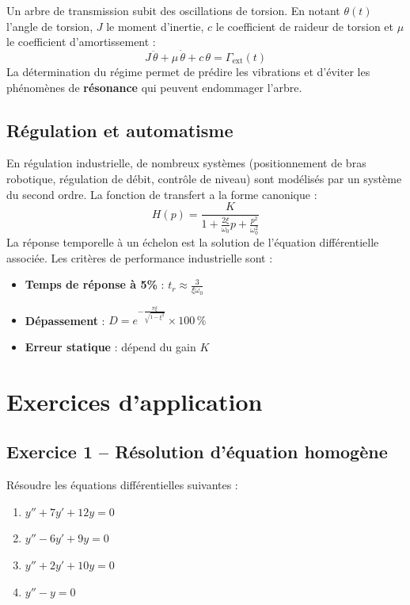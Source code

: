 \documentclass[a4paper,11pt]{article}
\begin{document}
\begin{appliindus}
Un arbre de transmission subit des oscillations de torsion. En notant $\theta(t)$ l'angle de torsion, $J$ le moment d'inertie, $c$ le coefficient de raideur de torsion et $\mu$ le coefficient d'amortissement :
\[
J\,\ddot{\theta} + \mu\,\dot{\theta} + c\,\theta = \Gamma_{\text{ext}}(t)
\]
La détermination du régime permet de prédire les vibrations et d'éviter les phénomènes de \textbf{résonance} qui peuvent endommager l'arbre.
\end{appliindus}

\subsection{Régulation et automatisme}

\begin{appliindus}
En régulation industrielle, de nombreux systèmes (positionnement de bras robotique, régulation de débit, contrôle de niveau) sont modélisés par un système du second ordre. La fonction de transfert a la forme canonique :
\[
H(p) = \frac{K}{1 + \frac{2\xi}{\omega_0}p + \frac{p^2}{\omega_0^2}}
\]
La réponse temporelle à un échelon est la solution de l'équation différentielle associée. Les critères de performance industrielle sont :
\begin{itemize}
  \item \textbf{Temps de réponse à 5\%} : $t_r \approx \frac{3}{\xi\omega_0}$
  \item \textbf{Dépassement} : $D = e^{-\frac{\pi \xi}{\sqrt{1-\xi^2}}} \times 100\,\%$
  \item \textbf{Erreur statique} : dépend du gain $K$
\end{itemize}
\end{appliindus}

\newpage
\section{Exercices d'application}

\subsection*{Exercice 1 -- Résolution d'équation homogène}
Résoudre les équations différentielles suivantes :
\begin{enumerate}[label=\alph*)]
  \item $y'' + 7y' + 12y = 0$
  \item $y'' - 6y' + 9y = 0$
  \item $y'' + 2y' + 10y = 0$
  \item $y'' - y = 0$
\end{enumerate}
\end{document}
